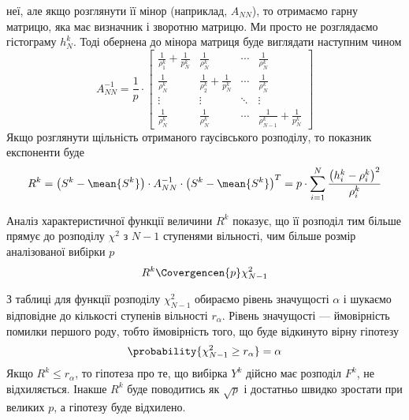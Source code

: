 неї, але якщо розглянути її мінор (наприклад, $A_{NN}$), то отримаємо гарну
матрицю, яка має визначник і зворотню матрицю. Ми просто не розглядаємо
гістограму $h_N^k$. Тоді обернена до мінора матриця буде виглядати наступним
чином
\begin{equation*}
  A_{NN}^{-1} = \frac{1}{p} \cdot
    \begin{bmatrix}
      \frac{1}{\rho_1^k}+\frac{1}{p_N^k} & \frac{1}{\rho_N^k}
        & \cdots & \frac{1}{\rho_N^k}                 \\
      \frac{1}{\rho_N^k}                 & \frac{1}{\rho_2^k}+\frac{1}{p_N^k}
        & \cdots & \frac{1}{\rho_N^k}                 \\
      \vdots                             & \vdots
        & \ddots & \vdots                             \\
      \frac{1}{\rho_N^k}                 & \frac{1}{\rho_N^k}
        & \cdots & \frac{1}{\rho_{N-1}^k}+\frac{1}{p_N^k}
    \end{bmatrix}
\end{equation*}
Якщо розглянути щільність отриманого гаусівського розподілу, то показник
експоненти буде
\begin{equation*}
  R^k
  = \left( S^k - \mean{S^k} \right) \cdot A_{NN}^{-1}
      \cdot \left( S^k - \mean{S^k} \right)^T
  = p \cdot \sum_{i=1}^{N}\frac{\left( h_i^k - \rho_i^k \right)^2}{\rho_i^k}
\end{equation*}
\begin{comment}
Маємо суму $p$ квадратів \textbf{залежних} між собою випадкових величин, що
приблизно мають стандартний гаусовський розподіл.
Хотілося б мати розподіл суми квадратів \textbf{незалежних} стандартних
гаусовських випадкових величин --- розподіл Пірсона $\chi^2$.
Виявляється, що залежність отриманих випадкових величин
забирає лише один ступінь вільності, і на виході отримуємо розподіл Пірсона з
$N-1$ ступенями вільності \cite{Hudson:1963}
\end{comment}
Аналіз характеристичної функції величини $R^k$ показує, що її розподіл тим
більше прямує до розподілу $\chi^2$ з $N-1$ ступенями вільності, чим більше
розмір аналізованої вибірки $p$
\begin{equation*}
  R^k \Covergencen{p} \chi_{N-1}^2
\end{equation*}

З таблиці для функції розподілу $\chi_{N-1}^2$ обираємо рівень значущості
$\alpha$ і шукаємо відповідне до кількості ступенів вільності $r_{\alpha}$.
Рівень значущості --- ймовірність помилки першого роду, тобто ймовірність того,
що буде відкинуто вірну гіпотезу
\begin{equation*}
  \probability{\chi_{N-1}^2 \ge r_{\alpha}} = \alpha
\end{equation*}
Якщо $R^k \le r_{\alpha}$, то гіпотеза про те, що вибірка $Y^k$ дійсно має
розподіл $F^k$, не відхиляється. Інакше $R^k$ буде поводитись як $\sqrt{p}$
і достатньо швидко зростати при великих $p$, а гіпотезу буде відхилено.

